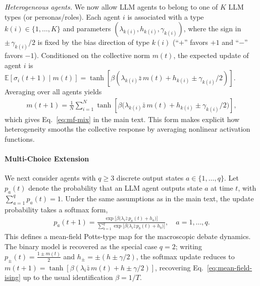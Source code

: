 \documentclass{article}
\theoremstyle{plain}
\theoremstyle{definition}
\theoremstyle{remark}
\begin{document}
\textsl{Heterogeneous agents.}
We now allow LLM agents to belong to one of $K$ LLM types (or personas/roles).
Each agent $i$ is associated with a type $k(i)\in\{1,\dots,K\}$ and parameters
$(\lambda_{k(i)},h_{k(i)},\gamma_{k(i)})$, where the sign in $\pm\,\gamma_{k(i)}/2$ is fixed by the bias direction of type $k(i)$
(``$+$'' favors $+1$ and ``$-$'' favors $-1$).
Conditioned on the collective norm $m(t)$, the expected update of agent $i$ is
$\mathbb{E}[\sigma_i(t+1)\mid m(t)]
=\tanh[\beta(\lambda_{k(i)} \bar{z}\,m(t)+h_{k(i)}\pm\gamma_{k(i)}/2)]$.
Averaging over all agents yields
\begin{align}
m(t+1)=\frac{1}{N}\sum_{i=1}^N
\tanh\!\left[\beta\bigl(\lambda_{k(i)} \bar{z}\,m(t)+h_{k(i)}\pm\gamma_{k(i)}/2\bigr)\right],
\end{align}
which gives Eq.~\eqref{eq:mf-mix} in the main text. This form makes explicit how heterogeneity smooths the collective response by averaging nonlinear activation functions.

\paragraph{Multi-Choice Extension}
We next consider agents with $q\ge 3$ discrete output states $a\in\{1,\dots,q\}$.
Let $p_a(t)$ denote the probability that an LLM agent outputs state $a$ at time $t$, with $\sum_{a=1}^q p_a(t)=1$.
Under the same assumptions as in the main text, the update probability takes a softmax form,
\begin{align}\label{eq:mf-potts}
p_a(t+1) = \frac{\exp\!\bigl[\beta\bigl(\lambda_i \bar{z}\,p_a(t)+h_a\bigr)\bigr]}
{\sum_{b=1}^q \exp\bigl[\beta\bigl(\lambda_i \bar{z}\,p_b(t)+h_b\bigr)\bigr]},
\quad a=1,\dots,q.
\end{align}
This defines a mean-field Potts-type map for the macroscopic debate dynamics.
The binary model is recovered as the special case $q=2$; writing $p_{\pm}(t)=\frac{1\pm m(t)}{2}$ and $h_{\pm}=\pm(h\pm\gamma/2)$, the softmax update reduces to
$m(t+1)=\tanh[\beta(\lambda_i \bar{z}\,m(t)+h\pm\gamma/2)]$, recovering Eq.~\eqref{eq:mean-field-ising} up to the usual identification $\beta=1/T$.
\end{document}
